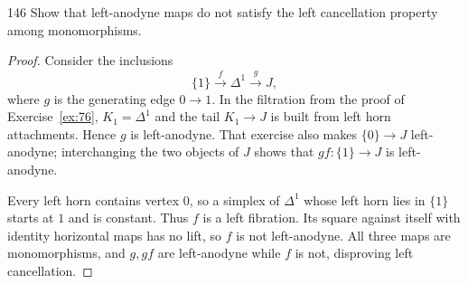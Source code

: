 \begin{exercise}{146}
Show that left-anodyne maps do not satisfy the left cancellation property
among monomorphisms.

\begin{proof}
Consider the inclusions
\[
 \{1\}\xrightarrow{f}\Delta^1\xrightarrow{g}J,
\]
where $g$ is the generating edge $0\to1$.
In the filtration from the proof of Exercise~\ref{ex:76},
$K_1=\Delta^1$ and the tail $K_1\to J$ is built from left horn
attachments. Hence $g$ is left-anodyne.
That exercise also makes $\{0\}\to J$ left-anodyne;
interchanging the two objects of $J$ shows that
$gf\colon\{1\}\to J$ is left-anodyne.

Every left horn contains vertex $0$, so a simplex of $\Delta^1$
whose left horn lies in $\{1\}$ starts at $1$ and is constant.
Thus $f$ is a left fibration.
Its square against itself with identity horizontal maps has no lift,
so $f$ is not left-anodyne.
All three maps are monomorphisms, and $g,gf$ are left-anodyne
while $f$ is not, disproving left cancellation.
\end{proof}
\end{exercise}
